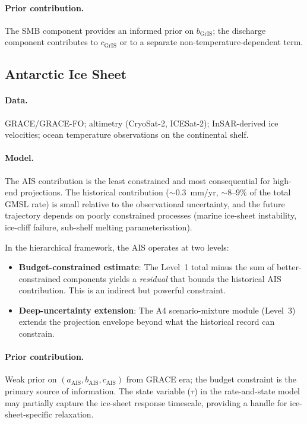 \documentclass[11pt]{article}
\begin{document}
\paragraph{Prior contribution.}  The SMB component provides an informed prior on $b_{\text{GrIS}}$; the discharge component contributes to $c_{\text{GrIS}}$ or to a separate non-temperature-dependent term.

\subsection{Antarctic Ice Sheet}
\label{sec:ais}

\paragraph{Data.}  GRACE/GRACE-FO; altimetry (CryoSat-2, ICESat-2); InSAR-derived ice velocities; ocean temperature observations on the continental shelf.

\paragraph{Model.}  The AIS contribution is the least constrained and most consequential for high-end projections.  The historical contribution ($\sim$0.3~mm/yr, $\sim$8--9\% of the total GMSL rate) is small relative to the observational uncertainty, and the future trajectory depends on poorly constrained processes (marine ice-sheet instability, ice-cliff failure, sub-shelf melting parameterisation).

In the hierarchical framework, the AIS operates at two levels:
\begin{itemize}
  \item \textbf{Budget-constrained estimate}: The Level~1 total minus the sum of better-constrained components yields a \emph{residual} that bounds the historical AIS contribution.  This is an indirect but powerful constraint.
  \item \textbf{Deep-uncertainty extension}: The A4 scenario-mixture module (Level~3) extends the projection envelope beyond what the historical record can constrain.
\end{itemize}

\paragraph{Prior contribution.}  Weak prior on $(a_{\text{AIS}}, b_{\text{AIS}}, c_{\text{AIS}})$ from GRACE era; the budget constraint is the primary source of information.  The state variable ($\tau$) in the rate-and-state model may partially capture the ice-sheet response timescale, providing a handle for ice-sheet-specific relaxation.
\end{document}
